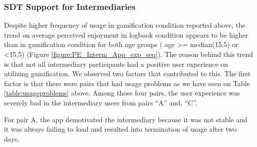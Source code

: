 \documentclass{sig-alternate}
\begin{document}
\subsubsection{{SDT Support for Intermediaries}}  
Despite higher frequency of usage in gamification condition reported above, the trend on average perceived enjoyment in logbook condition appears to be higher than in gamification condition for both age groups ( age \textgreater = median(15.5) or \textless 15.5) (Figure \ref{figure:PE_Interm_App_exp_seq}). The reason behind this trend is that not all intermediary participants had a positive user experience on utilizing gamification. We observed two factors that contributed  to this. The first factor is that there were pairs that had usage problems as we have seen on Table \ref{table:usageproblems} above. Among those four pairs, the user experience was severely bad in the intermediary users from pairs ``A'' and, ``C''.

For pair A, the app demotivated the intermediary because it was not stable  and it was always failing to load and resulted into termination of usage after two days.
\end{document}
